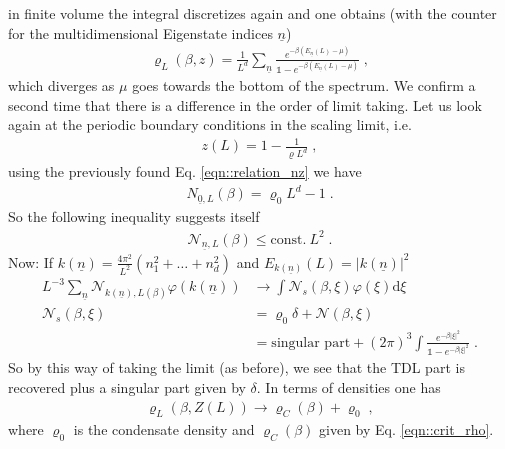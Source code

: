 \documentclass[
a4paper, %
11pt, %
onecolumn, %
openany, %
]{memoir}
\theoremstyle{definition}
\theoremstyle{remark}
\theoremstyle{plain}
\begin{document}
in finite volume the integral discretizes again and one obtains (with the counter for the multidimensional Eigenstate indices $\underline{n}$)\begin{align}
\varrho_{L}(\beta,z)=\frac{1}{L^d}\sum_{\underline{n}}\frac{e^{-\beta(E_{\underline{n}}(L)-\mu)}}{\mathds{1}-e^{-\beta(E_{\underline{n}}(L)-\mu)}}\; ,
\end{align}
which diverges as $\mu$ goes towards the bottom of the spectrum. We confirm a second time that there is a difference in the order of limit taking. Let us look again at the periodic boundary conditions in the scaling limit, i.e. \begin{align}
z(L)=1-\frac{1}{\varrho L^d}\; ,
\end{align}
using the previously found Eq. \eqref{eqn::relation_nz} we have \begin{align}
N_{\underline{0},L}(\beta)=\varrho_0L^d-1\; .
\end{align}
So the following inequality suggests itself \begin{align}
\mathcal{N}_{\underline{n},L}(\beta)\leq \mathrm{const.}~L^2\; .
\end{align}
Now: If $k(\underline{n})=\frac{4\pi^2}{L^2}(n_1^2+\ldots+n_d^2)$ and $E_{k(\underline{n})}(L)=|k(\underline{n})|^2$ \begin{align}
L^{-3}\sum_{\underline{n}}\mathcal{N}_{k(\underline{n}),L(\beta)}\varphi(k(\underline{n}))&\longrightarrow \int\mathcal{N}_s(\beta,\xi)\varphi(\xi)\mathrm{d}\xi\\
\mathcal{N}_s(\beta,\xi)&=\varrho_0\delta+\mathcal{N}(\beta,\xi)\\
&=\text{singular part} + (2\pi)^3\int\frac{e^{-\beta|\xi|^2}}{\mathds{1}-e^{-\beta|\xi|^2}}\;.
\end{align}
So by this way of taking the limit (as before), we see that the TDL part is recovered plus a singular part given by $\delta$. In terms of densities one has \begin{align}
\varrho_L(\beta,Z(L))\rightarrow\varrho_C(\beta)+\varrho_0\; ,
\end{align}
where $\varrho_0$ is the condensate density and $\varrho_C(\beta)$ given by Eq. \eqref{eqn::crit_rho}.
\end{document}
